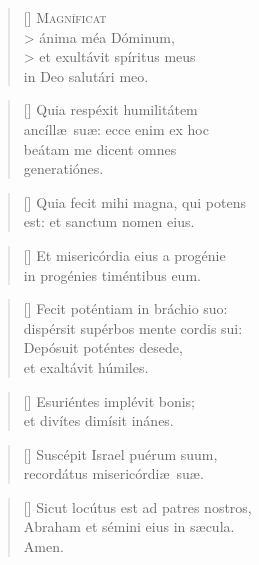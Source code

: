 \documentclass[omni.tex]{subfiles}
\begin{document}
\settowidth{\versewidth}{Et ne nos ind\'ucas in tentati\'onem}

\begin{verse}[\versewidth]
\lettrine[lhang=1.0,nindent=0em]{M}{agn\'ificat} \\>
\'anima m\'ea D\'ominum, \\>
et exult\'avit sp\'iritus meus \\
in Deo salut\'ari meo.
\end{verse}

\begin{verse}[\versewidth]
Quia resp\'exit humilit\'atem \\
anc\'ill\ae\ su\ae: ecce enim ex hoc \\
be\'atam me dicent omnes \\
generati\'ones.
\end{verse}

\begin{verse}[\versewidth]
Quia fecit mihi magna, qui potens \\
est: et sanctum nomen eius.
\end{verse}

\begin{verse}[\versewidth]
Et miseric\'ordia eius a prog\'enie \\
in prog\'enies tim\'entibus eum.
\end{verse}
\pagebreak

\begin{verse}[\versewidth]
Fecit pot\'entiam in br\'achio suo: \\
disp\'ersit sup\'erbos mente cordis sui: \\
Dep\'osuit pot\'entes desede, \\
et exalt\'avit h\'umiles.
\end{verse}

\begin{verse}[\versewidth]
Esuri\'entes impl\'evit bonis; \\
et div\'ites dim\'isit in\'anes.
\end{verse}

\begin{verse}[\versewidth]
Susc\'epit Israel pu\'erum suum, \\
record\'atus miseric\'ordi\ae\ su\ae.
\end{verse}

\begin{verse}[\versewidth]
Sicut loc\'utus est ad patres nostros, \\
Abraham et s\'emini eius in s\ae cula. \\
Amen. \\[2\baselineskip]
\end{verse}

\pagebreak
\end{document}
